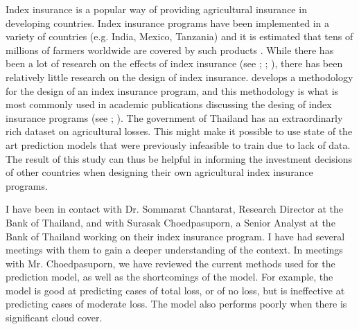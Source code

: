 \documentclass[12pt]{article}
\begin{document}
Index insurance is a popular way of providing agricultural insurance in developing countries. Index insurance programs have been implemented in a variety of countries (e.g. India, Mexico, Tanzania) and it is estimated that tens of millions of farmers worldwide are covered by such products \cite{greatrex2015scaling}. While there has been a lot of research on the effects of index insurance (see \cite{casaburi2018time};  \cite{karlan2014agricultural}; \cite{cai2020subsidy}), there has been relatively little research on the design of index insurance. \cite{chantarat2013designing} develops a methodology for the design of an index insurance program, and this methodology is what is most commonly used in academic publications discussing the desing of index insurance programs (see \cite{jensen2019does}; \cite{flatnes2018improving}). The government of Thailand has an extraordinarly rich dataset on agricultural losses. This might make it possible to use state of the art prediction models that were previously infeasible to train due to lack of data. The result of this study can thus be helpful in informing the investment decisions of other countries when designing their own agricultural index insurance programs. 

I have been in contact with Dr. Sommarat Chantarat, Research Director at the Bank of Thailand, and with Surasak Choedpasuporn, a Senior Analyst at the Bank of Thailand working on their index insurance program. I have had several meetings with them to gain a deeper understanding of the context. In meetings with Mr. Choedpasuporn, we have reviewed the current methods used for the prediction model, as well as the shortcomings of the model. For example, the model is good at predicting cases of total loss, or of no loss, but is ineffective at predicting cases of moderate loss. The model also performs poorly when there is significant cloud cover. 
\end{document}
